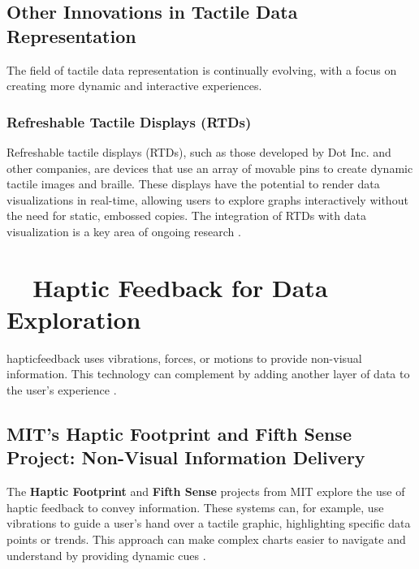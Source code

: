 \subsection{Other Innovations in Tactile Data Representation}\label{ch13:ssec:tactile-innovations}
The field of tactile data representation is continually evolving, with a focus on creating more dynamic and interactive experiences.

\subsubsection{Refreshable Tactile Displays (RTDs)}\label{ch13:sssec:rtds}
Refreshable tactile displays (RTDs), such as those developed by Dot Inc. and other companies, are devices that use an array of movable pins to create dynamic tactile images and braille. These displays have the potential to render data visualizations in real-time, allowing users to explore graphs interactively without the need for static, embossed copies. The integration of RTDs with data visualization  is a key area of ongoing research \supercite{DotInc, OrbitGraphiti}.

\section{~~Haptic Feedback for Data Exploration}\label{ch13:sec:haptic-feedback}
\gls{hapticfeedback} uses vibrations, forces, or motions to provide non-visual information. This technology can complement  by adding another layer of data to the user's experience \supercite{HapticDataViz}.

\subsection{MIT's Haptic Footprint and Fifth Sense Project: Non-Visual Information Delivery}\label{ch13:ssec:haptic-footprint}
The \textbf{Haptic Footprint} and \textbf{Fifth Sense} projects from MIT explore the use of haptic feedback to convey information. These systems can, for example, use vibrations to guide a user's hand over a tactile graphic, highlighting specific data points or trends. This approach can make complex charts easier to navigate and understand by providing dynamic cues \supercite{HapticFootprint, MITFifthSense}.

